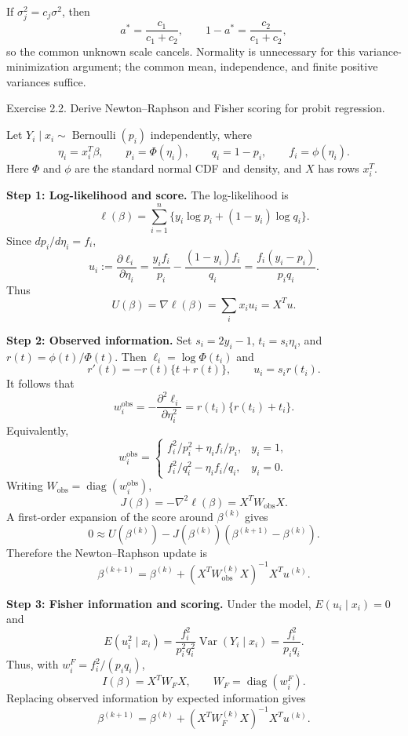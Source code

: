 \documentclass[answers,12pt,addpoints]{exam}
\begin{document}
\begin{questions}
\begin{solution}
If $\sigma_j^2=c_j\sigma^2$, then
\[
a^*=\frac{c_1}{c_1+c_2},\qquad 1-a^*=\frac{c_2}{c_1+c_2},
\]
so the common unknown scale cancels. Normality is unnecessary for this
variance-minimization argument; the common mean, independence, and finite
positive variances suffice.
\end{solution}

\question Exercise 2.2. Derive Newton--Raphson and Fisher scoring
for probit regression.
\begin{solution}
Let $Y_i\mid x_i\sim\operatorname{Bernoulli}(p_i)$ independently, where
\[
\eta_i=x_i^T\beta,\qquad p_i=\Phi(\eta_i),\qquad
q_i=1-p_i,\qquad f_i=\phi(\eta_i).
\]
Here $\Phi$ and $\phi$ are the standard normal CDF and density, and
$X$ has rows $x_i^T$.

\textbf{Step 1: Log-likelihood and score.}
The log-likelihood is
\[
\ell(\beta)=\sum_{i=1}^n\{y_i\log p_i+(1-y_i)\log q_i\}.
\]
Since $dp_i/d\eta_i=f_i$,
\[
u_i:=\frac{\partial\ell_i}{\partial\eta_i}
=\frac{y_if_i}{p_i}-\frac{(1-y_i)f_i}{q_i}
=\frac{f_i(y_i-p_i)}{p_iq_i}.
\]
Thus
\[
\boxed{U(\beta)=\nabla\ell(\beta)=\sum_i x_iu_i=X^Tu.}
\]

\textbf{Step 2: Observed information.}
Set $s_i=2y_i-1$, $t_i=s_i\eta_i$, and
$r(t)=\phi(t)/\Phi(t)$. Then $\ell_i=\log\Phi(t_i)$ and
\[
r'(t)=-r(t)\{t+r(t)\},\qquad u_i=s_ir(t_i).
\]
It follows that
\[
w_i^{\mathrm{obs}}=-\frac{\partial^2\ell_i}{\partial\eta_i^2}
=r(t_i)\{r(t_i)+t_i\}.
\]
Equivalently,
\[
w_i^{\mathrm{obs}}=
\begin{cases}
f_i^2/p_i^2+\eta_if_i/p_i,&y_i=1,\\
f_i^2/q_i^2-\eta_if_i/q_i,&y_i=0.
\end{cases}
\]
Writing $W_{\mathrm{obs}}=\operatorname{diag}(w_i^{\mathrm{obs}})$,
\[
J(\beta)=-\nabla^2\ell(\beta)=X^TW_{\mathrm{obs}}X.
\]
A first-order expansion of the score around $\beta^{(k)}$ gives
\[
0\approx U(\beta^{(k)})-J(\beta^{(k)})
(\beta^{(k+1)}-\beta^{(k)}).
\]
Therefore the Newton--Raphson update is
\[
\boxed{\beta^{(k+1)}=\beta^{(k)}+
(X^TW_{\mathrm{obs}}^{(k)}X)^{-1}X^Tu^{(k)}.}
\]

\textbf{Step 3: Fisher information and scoring.}
Under the model, $E(u_i\mid x_i)=0$ and
\[
E(u_i^2\mid x_i)
=\frac{f_i^2}{p_i^2q_i^2}\operatorname{Var}(Y_i\mid x_i)
=\frac{f_i^2}{p_iq_i}.
\]
Thus, with $w_i^F=f_i^2/(p_iq_i)$,
\[
I(\beta)=X^TW_FX,\qquad W_F=\operatorname{diag}(w_i^F).
\]
Replacing observed information by expected information gives
\[
\boxed{\beta^{(k+1)}=\beta^{(k)}+
(X^TW_F^{(k)}X)^{-1}X^Tu^{(k)}.}
\]


\end{solution}
\end{questions}
\end{document}
